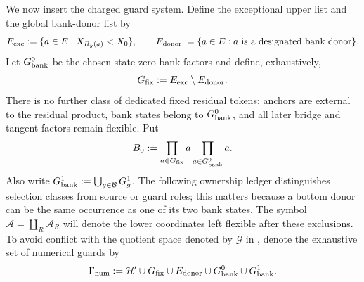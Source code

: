 \documentclass[11pt]{article}
\numberwithin{equation}{section}
\theoremstyle{definition}
\theoremstyle{remark}
\newcommand{\1}{\mathbf 1}
\begin{document}
We now insert the charged guard system.  Define the exceptional upper
list and the global bank-donor list by
\begin{equation}
 E_{\rm exc}:=\{a\in E:X_{R_y(a)}<X_0\},\qquad
 E_{\rm donor}:=\{a\in E:a\hbox{ is a designated bank donor}\}.
 \label{eq:rough-exceptional-donor-lists}
\end{equation}
Let \(G_{\rm bank}^0\) be the chosen state-zero bank factors and define,
exhaustively,
\begin{equation}
                         G_{\rm fix}:=E_{\rm exc}\setminus E_{\rm donor}.
 \label{eq:rough-fixed-list-closed}
\end{equation}
There is no further class of dedicated fixed residual tokens: anchors are
external to the residual product, bank states belong to
\(G_{\rm bank}^0\), and all later bridge and tangent factors remain
flexible.  Put
\begin{equation}
 B_0:=\prod_{a\in G_{\rm fix}}a
       \prod_{a\in G_{\rm bank}^0}a.
 \label{eq:rough-charged-base}
\end{equation}
Also write \(G_{\rm bank}^1:=\bigcup_{g\in\mathcal B}G_g^1\).  The
following ownership ledger distinguishes selection classes from source or
guard roles; this matters because a bottom donor can be the same
occurrence as one of its two bank states.
The symbol \(\mathcal A=\coprod_R\mathcal A_R\) will denote the lower
coordinates left flexible after these exclusions.
To avoid conflict with the quotient space denoted by \(\mathcal G\) in
, denote the exhaustive set of numerical guards by
\begin{equation}
 \Gamma_{\rm num}:=\mathcal H'\cup G_{\rm fix}\cup E_{\rm donor}
       \cup G_{\rm bank}^0\cup G_{\rm bank}^1.
 \label{eq:numerical-guard-set}
\end{equation}
\end{document}
